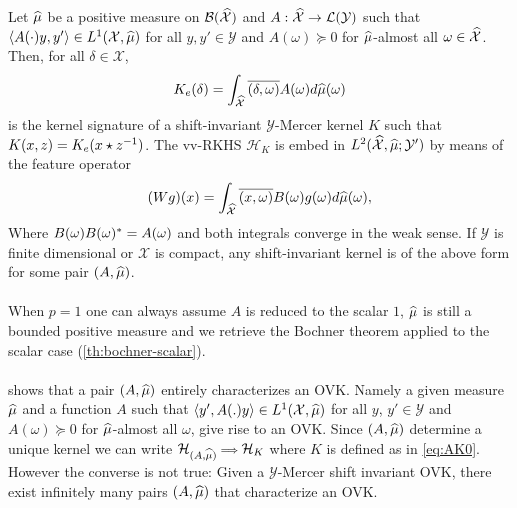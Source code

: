 \documentclass[twoside,11pt]{article}
\begin{document}
\begin{proposition}
    \label{pr:mercer_kernel_bochner}
    Let $\widehat{\mu}$ be a positive measure on
    $\mathcal{B}(\mathcal{\widehat{\mathcal{X}}})$ and $A: \widehat{\mathcal{X}}\to
    \mathcal{L}(\mathcal{Y})$ such that $\langle A(\cdot)y,y'\rangle\in
    L^1(\mathcal{X},\widehat{\mu})$ for all $y,y'\in\mathcal{Y}$ and
    $A(\omega)\succcurlyeq 0$ for $\widehat{\mu}$-almost all
    $\omega\in\widehat{\mathcal{X}}$. Then, for all $\delta \in \mathcal{X}$,
    \begin{dmath}
        \label{eq:AK0}
        K_e(\delta)=\int_{\dual{\mathcal{X}}} \conj{\pairing{\delta, \omega}}
        A(\omega) d\dual{\mu}(\omega)
    \end{dmath}
    is the kernel signature of a shift-invariant $\mathcal{Y}$-Mercer kernel
    $K$ such that $K(x,z)=K_e(x \star {z}^{-1})$. The \acs{vv-RKHS}
    $\mathcal{H}_K$ is embed in
    $L^2(\widehat{\mathcal{X}},\widehat{\mu};\mathcal{Y}')$ by means of the feature
    operator
    \begin{dmath}
        \label{eq:feature_operator}
        (Wg)(x)=\int_{\mathcal{\dual{X}}} \conj{\pairing{x,\omega}} B(\omega)
        g(\omega) d\dual{\mu}(\omega),
    \end{dmath}
    Where $B(\omega)B(\omega)^*=A(\omega)$ and both integrals converge
    in the weak sense. If $\mathcal{Y}$ is finite dimensional or $\mathcal{X}$
    is compact, any shift-invariant kernel is of the above form for some pair
    $(A, \widehat{\mu})$.
\end{proposition}
\paragraph{}
When $p=1$ one can always assume $A$ is reduced to the scalar $1$, $\widehat{\mu}$
is still a bounded positive measure and we retrieve the Bochner theorem applied
to the scalar case (\cref{th:bochner-scalar}).
\paragraph{}
 shows that a pair $(A,\widehat{\mu})$ entirely
characterizes an \acs{OVK}. Namely a given measure $\widehat{\mu}$ and a function
$A$ such that $\langle y', A(.)y\rangle\in L^1(\mathcal{X},\widehat{\mu})$ for all $y$,
$y'\in\mathcal{Y}$ and $A(\omega)\succcurlyeq 0$ for $\widehat{\mu}$-almost all
$\omega$, give rise to an \acs{OVK}. Since $(A,\widehat{\mu})$ determine a unique
kernel we can write
$\mathcal{H}_{(A,\widehat{\mu})}{\scriptstyle\implies}\mathcal{H}_K$ where $K$ is
defined as in \cref{eq:AK0}. However the converse is not true: Given a
$\mathcal{Y}$-Mercer shift invariant \acl{OVK}, there exist infinitely many
pairs $(A,\widehat{\mu})$ that characterize an \acs{OVK}.
\end{document}

